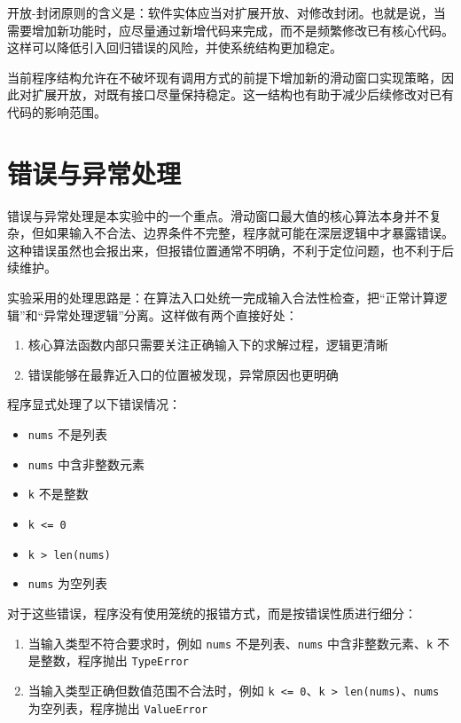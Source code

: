 \documentclass[a4paper,UTF8,fontset=none]{ctexart}
\begin{document}
开放-封闭原则的含义是：软件实体应当对扩展开放、对修改封闭。也就是说，当需要增加新功能时，应尽量通过新增代码来完成，而不是频繁修改已有核心代码。这样可以降低引入回归错误的风险，并使系统结构更加稳定。

\medskip

当前程序结构允许在不破坏现有调用方式的前提下增加新的滑动窗口实现策略，因此对扩展开放，对既有接口尽量保持稳定。这一结构也有助于减少后续修改对已有代码的影响范围。

\section{错误与异常处理}

错误与异常处理是本实验中的一个重点。滑动窗口最大值的核心算法本身并不复杂，但如果输入不合法、边界条件不完整，程序就可能在深层逻辑中才暴露错误。这种错误虽然也会报出来，但报错位置通常不明确，不利于定位问题，也不利于后续维护。

实验采用的处理思路是：在算法入口处统一完成输入合法性检查，把“正常计算逻辑”和“异常处理逻辑”分离。这样做有两个直接好处：

\begin{enumerate}
    \item 核心算法函数内部只需要关注正确输入下的求解过程，逻辑更清晰
    \item 错误能够在最靠近入口的位置被发现，异常原因也更明确
\end{enumerate}

程序显式处理了以下错误情况：

\begin{itemize}
    \item \texttt{nums} 不是列表
    \item \texttt{nums} 中含非整数元素
    \item \texttt{k} 不是整数
    \item \texttt{k <= 0}
    \item \texttt{k > len(nums)}
    \item \texttt{nums} 为空列表
\end{itemize}

对于这些错误，程序没有使用笼统的报错方式，而是按错误性质进行细分：

\begin{enumerate}
    \item 当输入类型不符合要求时，例如 \texttt{nums} 不是列表、\texttt{nums} 中含非整数元素、\texttt{k} 不是整数，程序抛出 \texttt{TypeError}
    \item 当输入类型正确但数值范围不合法时，例如 \texttt{k <= 0}、\texttt{k > len(nums)}、\texttt{nums} 为空列表，程序抛出 \texttt{ValueError}
\end{enumerate}
\end{document}
